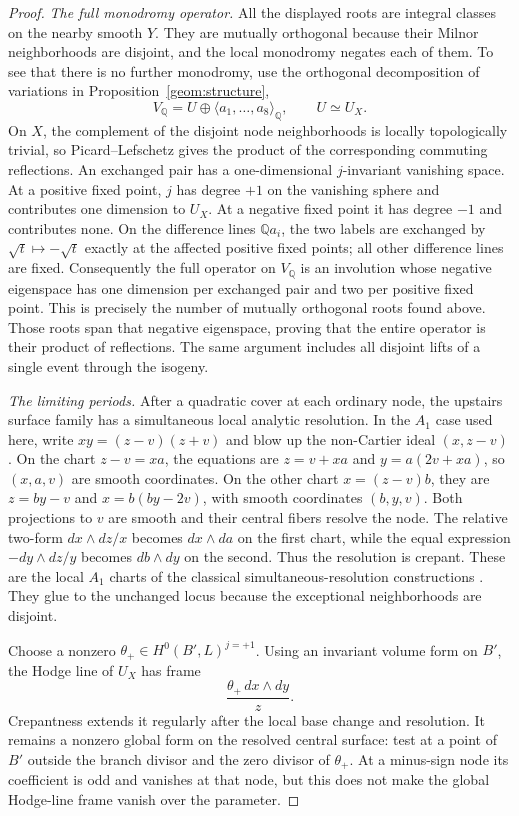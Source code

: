 \documentclass[11pt]{amsart}
\newcommand{\Q}{\mathbb Q}
\theoremstyle{definition}
\theoremstyle{remark}
\numberwithin{equation}{section}
\begin{document}
\begin{proof}
\emph{The full monodromy operator.}
All the displayed roots are integral classes on the nearby smooth
\(Y\).  They are mutually orthogonal because their Milnor
neighborhoods are disjoint, and the local monodromy negates each of
them.  To see that there is no further monodromy, use the orthogonal
decomposition of variations in Proposition~\ref{geom:structure},
\[
 V_\Q=U\oplus\langle a_1,\ldots,a_8\rangle_\Q,
 \qquad U\simeq U_X.
\]
On \(X\), the complement of the disjoint node neighborhoods is
locally topologically trivial, so Picard--Lefschetz gives the product
of the corresponding commuting reflections.  An exchanged pair has
a one-dimensional \(j\)-invariant vanishing space.  At a positive
fixed point, \(j\) has degree \(+1\) on the vanishing sphere and
contributes one dimension to \(U_X\).  At a negative fixed point it
has degree \(-1\) and contributes none.  On the difference lines
\(\Q a_i\), the two labels are exchanged by \(\sqrt t\mapsto-\sqrt t\)
exactly at the affected positive fixed points; all other difference
lines are fixed.  Consequently the full operator on \(V_\Q\) is an
involution whose negative eigenspace has one dimension per exchanged
pair and two per positive fixed point.  This is precisely the number
of mutually orthogonal roots found above.  Those roots span that
negative eigenspace, proving that the entire operator is their
product of reflections.  The same argument includes all disjoint
lifts of a single event through the isogeny.

\emph{The limiting periods.}
After a quadratic cover at each ordinary node, the upstairs surface
family has a simultaneous local analytic resolution.  In the
\(A_1\) case used here, write \(xy=(z-v)(z+v)\) and blow up the
non-Cartier ideal \((x,z-v)\).  On the chart \(z-v=xa\), the equations
are \(z=v+xa\) and \(y=a(2v+xa)\), so \((x,a,v)\) are smooth
coordinates.  On the other chart \(x=(z-v)b\), they are
\(z=by-v\) and \(x=b(by-2v)\), with smooth coordinates \((b,y,v)\).
Both projections to \(v\) are smooth and their central fibers resolve
the node.  The relative two-form \(dx\wedge dz/x\) becomes
\(dx\wedge da\) on the first chart, while the equal expression
\(-dy\wedge dz/y\) becomes \(db\wedge dy\) on the second.  Thus the
resolution is crepant.  These are the local \(A_1\) charts of the
classical simultaneous-resolution constructions
\cite{Brieskorn,ArtinResolution}.  They glue to the unchanged locus
because the exceptional neighborhoods are disjoint.

Choose a nonzero
\(\theta_+\in H^0(B',L)^{j=+1}\).  Using an invariant volume form
on \(B'\), the Hodge line of \(U_X\) has frame
\[
 \frac{\theta_+\,dx\wedge dy}{z}.
\]
Crepantness extends it regularly after the local base change and
resolution.  It remains a nonzero global form on the resolved central
surface: test at a point of \(B'\) outside the branch divisor and the
zero divisor of \(\theta_+\).  At a minus-sign node its coefficient
is odd and vanishes at that node, but this does not make the global
Hodge-line frame vanish over the parameter.


\end{proof}
\end{document}
